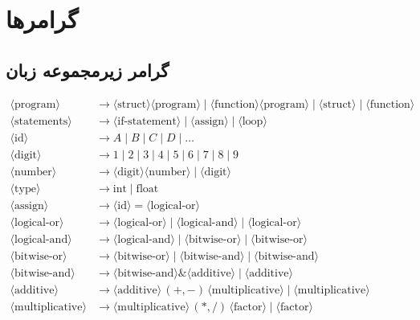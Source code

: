 \documentclass[12pt, a4paper]{report}
\begin{document}
\section{گرامرها}
\subsection{گرامر زیرمجموعه زبان}

\begin{align*}
	\langle \text{program} \rangle &\to \langle \text{struct} \rangle \langle \text{program} \rangle \mid \langle \text{function} \rangle \langle \text{program} \rangle \mid \langle \text{struct} \rangle \mid \langle \text{function} \rangle \\
	\langle \text{statements} \rangle &\to \langle \text{if-statement} \rangle \mid \langle \text{assign} \rangle \mid \langle \text{loop} \rangle \\
	\langle \text{id} \rangle &\to A \mid B \mid C \mid D \mid \dots \\
	\langle \text{digit} \rangle &\to 1 \mid 2 \mid 3 \mid 4 \mid 5 \mid 6 \mid 7 \mid 8 \mid 9 \\
	\langle \text{number} \rangle &\to \langle \text{digit} \rangle \langle \text{number} \rangle \mid \langle \text{digit} \rangle \\
	\langle \text{type} \rangle &\to \text{int} \mid \text{float} \\
	\langle \text{assign} \rangle &\to \langle \text{id} \rangle = \langle \text{logical-or} \rangle \\
	\langle \text{logical-or} \rangle &\to \langle \text{logical-or} \rangle \mid \langle \text{logical-and} \rangle \mid \langle \text{logical-or} \rangle \\
	\langle \text{logical-and} \rangle &\to \langle \text{logical-and} \rangle \mid \langle \text{bitwise-or} \rangle \mid \langle \text{bitwise-or} \rangle \\
	\langle \text{bitwise-or} \rangle &\to \langle \text{bitwise-or} \rangle \mid \langle \text{bitwise-and} \rangle \mid \langle \text{bitwise-and} \rangle \\
	\langle \text{bitwise-and} \rangle &\to \langle \text{bitwise-and} \rangle \& \langle \text{additive} \rangle \mid \langle \text{additive} \rangle \\
	\langle \text{additive} \rangle &\to \langle \text{additive} \rangle \, (+, -) \, \langle \text{multiplicative} \rangle \mid \langle \text{multiplicative} \rangle \\
	\langle \text{multiplicative} \rangle &\to \langle \text{multiplicative} \rangle \, (*, /) \, \langle \text{factor} \rangle \mid \langle \text{factor} \rangle \\

\end{align*}
\end{document}
